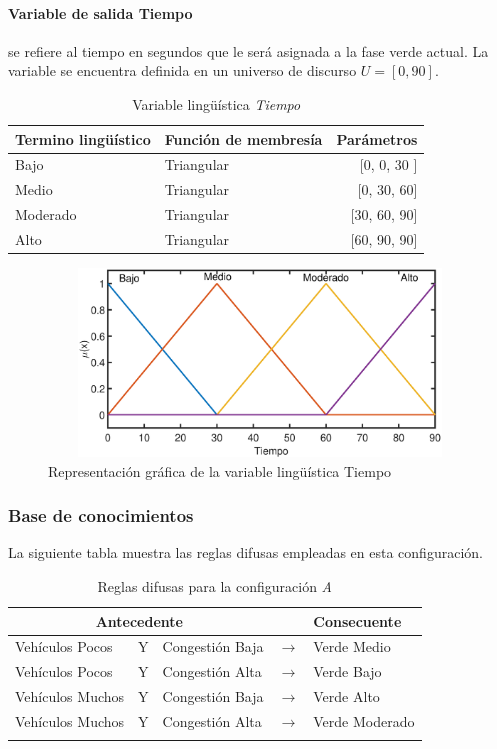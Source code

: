 \newpage
\paragraph{Variable de salida Tiempo} se refiere al tiempo en segundos que le será asignada a la fase verde actual. La variable se encuentra definida en un universo de discurso $U = [0,90]$.

\begin{table}[!h]
	\centering
	\begin{tabular}{llr} \toprule
		Termino lingüístico & Función de membresía & Parámetros \\ \midrule
		Bajo & Triangular & [0, 0, 30 ] \\
		Medio & Triangular & [0, 30, 60] \\
		Moderado & Triangular & [30, 60, 90] \\
		Alto & Triangular & [60, 90, 90] \\ \bottomrule
	\end{tabular}
	\caption{Variable lingüística \textit{Tiempo}}
\end{table}

\begin{figure}[H]
	\centering
	\includegraphics[height=5cm, width=12cm]{Variables/ConfigA_output1.eps}
	\caption[Gráfica variable lingüística tiempo - A]{Representación gráfica de la variable lingüística Tiempo}
\end{figure}

\subsubsection{Base de conocimientos}
La siguiente tabla muestra las reglas difusas empleadas en esta configuración.
\begin{longtable}[c]{lclcl} \toprule
	\multicolumn{3}{c}{Antecedente} & & Consecuente \\ \midrule
	Vehículos Pocos & Y & Congestión Baja& $\rightarrow$ & Verde Medio \\
	Vehículos Pocos & Y & Congestión Alta& $\rightarrow$ & Verde Bajo \\
	Vehículos Muchos &Y& Congestión Baja& $\rightarrow$ & Verde Alto \\
	Vehículos Muchos &Y& Congestión Alta& $\rightarrow$ & Verde Moderado \\ \hline
	\caption{Reglas difusas para la configuración \textit{A}}
\end{longtable}

